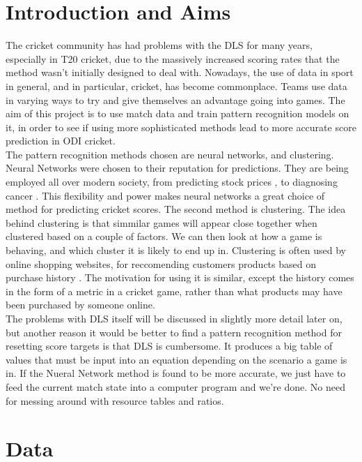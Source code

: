\documentclass[11pt]{amsart}
\begin{document}
\section{Introduction and Aims}
The cricket community has had problems with the DLS for many years, especially in T20 cricket, due to the massively increased scoring rates that the method 
wasn't initially designed to deal with. Nowadays, the use of data in sport in general, and in particular, cricket, has become commonplace. Teams use data in varying
ways to try and give themselves an advantage going into games. The aim of this project is to use match data and train pattern recognition models on it, 
in order to see if using more sophisticated methods lead to more accurate score prediction in ODI cricket. \\

The pattern recognition methods chosen are neural networks, and clustering. Neural Networks were chosen to their reputation for predictions. They are being employed
all over modern society, from predicting stock prices \cite{nnstock}, to diagnosing cancer \cite{nncancer}. This flexibility and power makes neural networks 
a great choice of method for predicting cricket scores. The second method is clustering. The idea behind clustering is that simmilar games will appear close together 
when clustered based on a couple of factors. We can then look at how a game is behaving, and which cluster it is likely to end up in. Clustering is often used 
by online shopping websites, for reccomending customers products based on purchase history \cite{retailClus}. The motivation for using it is similar, except the history
comes in the form of a metric in a cricket game, rather than what products may have been purchased by someone online. \\

The problems with DLS itself will be discussed in slightly more detail later on, but another reason it would be better to find a pattern recognition method for resetting score targets
is that DLS is cumbersome. It produces a big table of values that must be input into an equation depending on the scenario a game is in. If the Nueral Network method 
is found to be more accurate, we just have to feed the current match state into a computer program and we're done. No need for messing around with resource tables and ratios. 


\section{Data}
\end{document}
